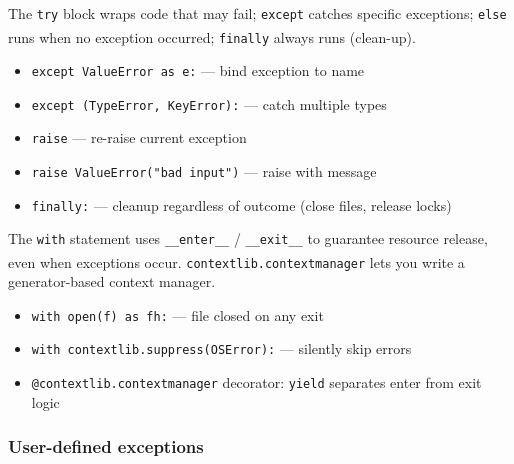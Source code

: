 \begin{tcbitemize}[ skin=sectionraster ]
    \tcbitem[title={try / except / finally}, raster multicolumn=3]
    The \texttt{try} block wraps code that may fail; \texttt{except} catches specific exceptions; \texttt{else} runs when no exception occurred; \texttt{finally} always runs (clean-up)\textsuperscript{\cite{romanoLearnPythonProgramming2021}}.
    \tcblower
    \begin{itemize}
        \item \texttt{except ValueError as e:} --- bind exception to name
        \item \texttt{except (TypeError, KeyError):} --- catch multiple types
        \item \texttt{raise} --- re-raise current exception
        \item \texttt{raise ValueError("bad input")} --- raise with message
        \item \texttt{finally:} --- cleanup regardless of outcome (close files, release locks)
    \end{itemize}

    \tcbitem[title={Context Managers as Error Guards}, raster multicolumn=3]
    The \texttt{with} statement uses \texttt{\_\_enter\_\_} / \texttt{\_\_exit\_\_} to guarantee resource release, even when exceptions occur\textsuperscript{\cite{romanoLearnPythonProgramming2021}}.
    \texttt{contextlib.contextmanager} lets you write a generator-based context manager.
    \tcblower
    \begin{itemize}
        \item \texttt{with open(f) as fh:} --- file closed on any exit
        \item \texttt{with contextlib.suppress(OSError):} --- silently skip errors
        \item \texttt{@contextlib.contextmanager} decorator: \texttt{yield} separates enter from exit logic
    \end{itemize}
\end{tcbitemize}

\subsubsection{User-defined exceptions}

